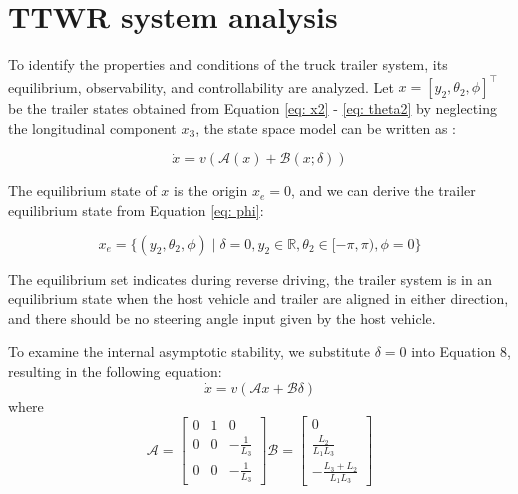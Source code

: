 \section{TTWR system analysis}
\label{section: ttwr system analysis}

To identify the properties and conditions of the truck trailer system, its equilibrium, observability, and controllability are analyzed. Let $ x = [y_2, \theta_2, \phi]^\intercal$ be the trailer states obtained from Equation \ref{eq: x2} - \ref{eq: theta2} by neglecting the longitudinal component $x_3$, the state space model can be written as \parencite{altafini2001feedback}:

\begin{equation} \dot{x} = v ( \mathcal{A} ( x ) + \mathcal{B} (x;\delta)) \label{eq: state space model}\end{equation}

The equilibrium state of $x$ is the origin $x_e = 0$, and we can derive the trailer equilibrium state from Equation \ref{eq: phi}: 

\begin{equation} x_e = \{(y_2, \theta_2, \phi) \mid \delta = 0, y_2 \in \mathbb{R}, \theta_2 \in [-\pi, \pi), \phi = 0\} \label{eq: equilibrium states}\end{equation}

The equilibrium set indicates during reverse driving, the trailer system is in an equilibrium state when the host vehicle and trailer are aligned in either direction, and there should be no steering angle input given by the host vehicle.

To examine the internal asymptotic stability, we substitute $\delta = 0$ into Equation 8, resulting in the following equation:
\begin{equation} 
\dot{x} = v ( \mathcal{A} x + \mathcal{B} \delta)
\label{eq: state space when delta is 0}
\end{equation}
where
\begin{equation} 
\mathcal{A} = \begin{bmatrix}
0 & 1 & 0 \\
0 & 0 & -\frac{1}{L_3} \\
0 & 0 & -\frac{1}{L_3}
\end{bmatrix} 
\mathcal{B}= \begin{bmatrix}
0 \\
\frac{L_2}{L_1L_3} \\
-\frac{L_3+L_2}{L_1L_3}
\end{bmatrix} \label{eq: state transfer matrix linearization}\end{equation}

